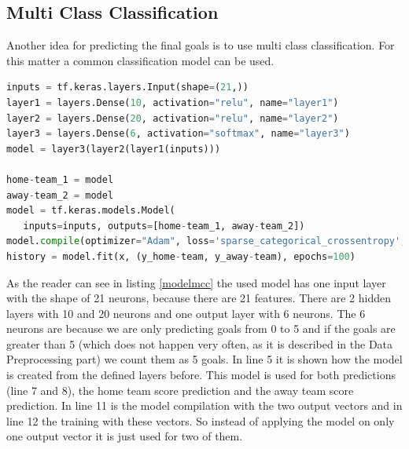 \begin{table}
\centering
{}
\caption{ Quality Model for Away Team and Home Team}
\label{table:qualitymodelregression}
\end{table}

\subsection{Multi Class Classification}
Another idea for predicting the final goals is to use multi class classification. For this matter a common classification model can be used. 

\begin{lstlisting}[language=Python, caption=Python code for multi class classification, label=modelmcc]
inputs = tf.keras.layers.Input(shape=(21,))
layer1 = layers.Dense(10, activation="relu", name="layer1")
layer2 = layers.Dense(20, activation="relu", name="layer2")
layer3 = layers.Dense(6, activation="softmax", name="layer3")
model = layer3(layer2(layer1(inputs)))

home-team_1 = model
away-team_2 = model
model = tf.keras.models.Model(
   inputs=inputs, outputs=[home-team_1, away-team_2])
model.compile(optimizer="Adam", loss='sparse_categorical_crossentropy', metrics=[ "acc"])
history = model.fit(x, (y_home-team, y_away-team), epochs=100)
\end{lstlisting}

As the reader can see in listing \ref{modelmcc} the used model has one input layer with the shape of 21 neurons, because there are 21 features. There are 2 hidden layers with 10 and 20 neurons and one output layer with 6 neurons. The 6 neurons are because we are only predicting goals from 0 to 5 and if the goals are greater than 5 (which does not happen very often, as it is described in the Data Preprocessing part) we count them as 5 goals. In line 5 it is shown how the model is created from the defined layers before. This model is used for both predictions (line 7 and 8), the home team score prediction and the away team score prediction. In line 11 is the model compilation with the two output vectors and in line 12 the training with these vectors. So instead of applying the model on only one output vector it is just used for two of them. 


